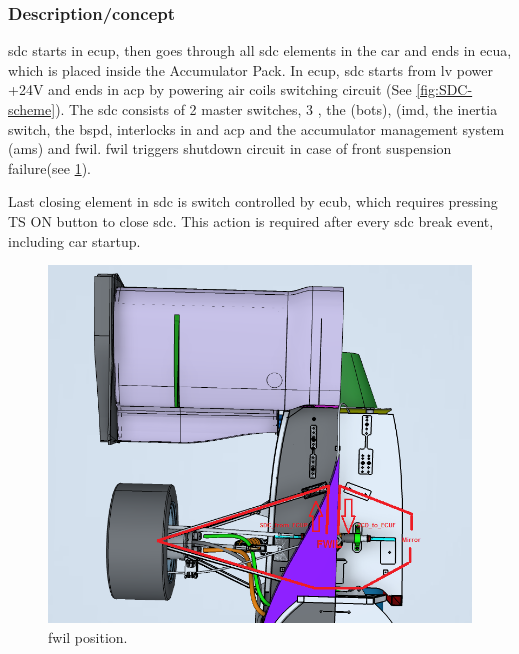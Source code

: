 
\subsubsection{Description/concept}

\Acrfull{sdc} starts in \gls{ecup}, then goes through all \gls{sdc} elements in the car and ends in \gls{ecua}, which is placed inside the Accumulator Pack. In \gls{ecup}, \gls{sdc} starts from \gls{lv} power +24V and ends in \gls{acp} by powering \gls{air} coils switching circuit (See \ref{fig:SDC-scheme}). The \gls{sdc} consists of 2 master switches, 3 , the (\acrfull{bots}), (\acrfull{imd}, the inertia switch, the \acrfull{bspd}, interlocks in  and \acrfull{acp} and the accumulator management system (\gls{ams}) and \gls{fwil}. \gls{fwil} triggers shutdown circuit in case of front suspension failure(see \ref{fig:fwil_scheme}).

Last closing element in \gls{sdc} is switch controlled by \gls{ecub}, which requires pressing TS ON button to close \gls{sdc}.
This action is required after every \gls{sdc} break event, including car startup.

\begin{figure}[H]
	\includegraphics[width=\textwidth]{./img/fwil.png}
	\caption{\gls{fwil} position.}
	\label{fig:fwil_scheme}
\end{figure}

